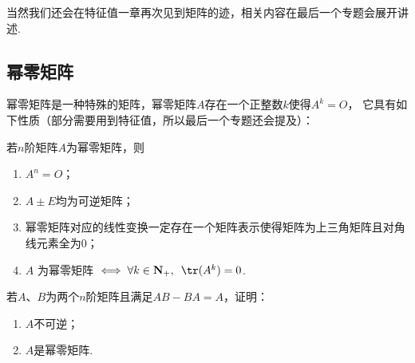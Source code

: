 当然我们还会在特征值一章再次见到矩阵的迹，相关内容在最后一个专题会展开讲述.

\subsection{幂零矩阵}
幂零矩阵是一种特殊的矩阵，幂零矩阵$A$存在一个正整数$k$使得$A^k=O$，
它具有如下性质（部分需要用到特征值，所以最后一个专题还会提及）：
\begin{theorem}
    若$n$阶矩阵$A$为幂零矩阵，则
    \begin{enumerate}
        \item $A^n=O$；

        \item $A\pm E$均为可逆矩阵；

        \item 幂零矩阵对应的线性变换一定存在一个矩阵表示使得矩阵为上三角矩阵且对角线元素全为0；

        \item $A$ 为幂零矩阵 $\iff \forall k \in \mathbf{N}_+,\enspace\tr(A^k)=0$.
    \end{enumerate}
\end{theorem}

\begin{example}
    若$A$、$B$为两个$n$阶矩阵且满足$AB-BA=A$，证明：
    \begin{enumerate}
        \item $A$不可逆；

        \item $A$是幂零矩阵.
    \end{enumerate}
\end{example}


